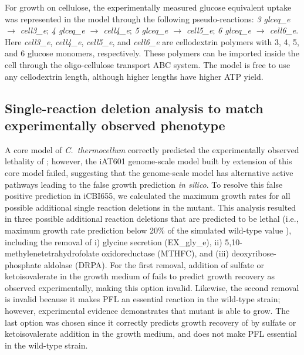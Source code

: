 For growth on cellulose, the experimentally measured glucose equivalent uptake was represented in the model through the following pseudo-reactions:
\textit{3 glceq\_e $\rightarrow$ cell3\_e}; \textit{4 glceq\_e $\rightarrow$ cell4\_e};
\textit{5 glceq\_e $\rightarrow$ cell5\_e}; \textit{6 glceq\_e $\rightarrow$ cell6\_e}.
Here \textit{cell3\_e}, \textit{cell4\_e}, \textit{cell5\_e}, and \textit{cell6\_e} are cellodextrin polymers with 3, 4, 5, and 6 glucose monomers, respectively. These polymers can be imported inside the cell through the oligo-cellulose transport ABC system.
The model is free to use any cellodextrin length, although higher lengths have higher ATP yield.\citep{zhang2005, thompson2016}

\subsection{Single-reaction deletion analysis to match experimentally observed phenotype}\label{sec:deletion_analysis}
A core model of \textit{C.~thermocellum}\citep{thompson2015} correctly predicted the experimentally observed lethality of ; however, the iAT601 genome-scale model built by extension of this core model failed, suggesting that the genome-scale model has alternative active pathways leading to the false growth prediction \textit{in silico}.
To resolve this false positive prediction in iCBI655, we calculated the maximum growth rates for all possible additional single reaction deletions in the  mutant.
This analysis resulted in three possible additional reaction deletions that are predicted to be lethal (i.e., maximum growth rate prediction below 20\% of the simulated wild-type value \citep{palsson2015}), including the removal of i) glycine secretion (EX\_gly\_e), ii) 5,10-methylenetetrahydrofolate oxidoreductase (MTHFC), and (iii) deoxyribose-phosphate aldolase (DRPA).
For the first removal, addition of sulfate or ketoisovalerate in the growth medium of  fails to predict growth recovery as observed experimentally,\citep{thompson2015} making this option invalid.
Likewise, the second removal is invalid because it makes PFL an essential reaction in the wild-type strain; however, experimental evidence demonstrates that  mutant is able to grow.\citep{papanek2015}
The last option was chosen since it correctly predicts growth recovery of  by sulfate or ketoisovalerate addition in the growth medium, and  does not make PFL essential in the wild-type strain.

